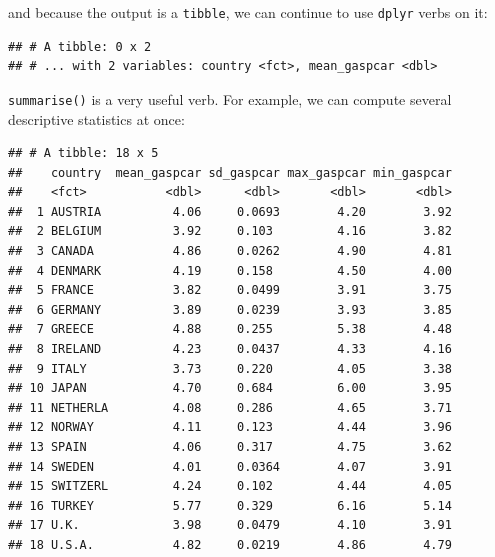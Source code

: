 \documentclass[]{gitbook}
\newenvironment{Shaded}{\begin{snugshade}}{\end{snugshade}}
\newcommand{\DataTypeTok}[1]{\textcolor[rgb]{0.13,0.29,0.53}{#1}}
\newcommand{\KeywordTok}[1]{\textcolor[rgb]{0.13,0.29,0.53}{\textbf{#1}}}
\newcommand{\NormalTok}[1]{#1}
\newcommand{\OperatorTok}[1]{\textcolor[rgb]{0.81,0.36,0.00}{\textbf{#1}}}
\newcommand{\StringTok}[1]{\textcolor[rgb]{0.31,0.60,0.02}{#1}}
\theoremstyle{definition}
\theoremstyle{definition}
\theoremstyle{definition}
\theoremstyle{remark}
\begin{document}
and because the output is a \texttt{tibble}, we can continue to use
\texttt{dplyr} verbs on it:

\begin{Shaded}
\end{Shaded}

\begin{verbatim}
## # A tibble: 0 x 2
## # ... with 2 variables: country <fct>, mean_gaspcar <dbl>
\end{verbatim}

\texttt{summarise()} is a very useful verb. For example, we can compute
several descriptive statistics at once:

\begin{Shaded}
\end{Shaded}

\begin{verbatim}
## # A tibble: 18 x 5
##    country  mean_gaspcar sd_gaspcar max_gaspcar min_gaspcar
##    <fct>           <dbl>      <dbl>       <dbl>       <dbl>
##  1 AUSTRIA          4.06     0.0693        4.20        3.92
##  2 BELGIUM          3.92     0.103         4.16        3.82
##  3 CANADA           4.86     0.0262        4.90        4.81
##  4 DENMARK          4.19     0.158         4.50        4.00
##  5 FRANCE           3.82     0.0499        3.91        3.75
##  6 GERMANY          3.89     0.0239        3.93        3.85
##  7 GREECE           4.88     0.255         5.38        4.48
##  8 IRELAND          4.23     0.0437        4.33        4.16
##  9 ITALY            3.73     0.220         4.05        3.38
## 10 JAPAN            4.70     0.684         6.00        3.95
## 11 NETHERLA         4.08     0.286         4.65        3.71
## 12 NORWAY           4.11     0.123         4.44        3.96
## 13 SPAIN            4.06     0.317         4.75        3.62
## 14 SWEDEN           4.01     0.0364        4.07        3.91
## 15 SWITZERL         4.24     0.102         4.44        4.05
## 16 TURKEY           5.77     0.329         6.16        5.14
## 17 U.K.             3.98     0.0479        4.10        3.91
## 18 U.S.A.           4.82     0.0219        4.86        4.79
\end{verbatim}
\end{document}
